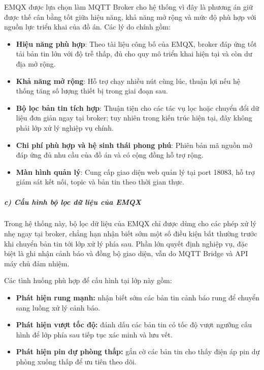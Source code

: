 \documentclass[a4paper]{extarticle}
\providecommand{\tightlist}{%
  \setlength{\itemsep}{0pt}\setlength{\parskip}{0pt}}
\begin{document}
EMQX được lựa chọn làm MQTT Broker cho hệ thống vì đây là phương án giữ
được thế cân bằng tốt giữa hiệu năng, khả năng mở rộng và mức độ phù hợp
với nguồn lực triển khai của đồ án. Các lý do chính gồm:

\begin{itemize}
\tightlist
\item
  \textbf{Hiệu năng phù hợp}: Theo tài liệu công bố của EMQX, broker đáp
  ứng tốt tải bản tin lớn với độ trễ thấp, đủ cho quy mô triển khai hiện
  tại và còn dư địa mở rộng.
\item
  \textbf{Khả năng mở rộng}: Hỗ trợ chạy nhiều nút cùng lúc, thuận lợi nếu
  hệ thống tăng số lượng thiết bị trong giai đoạn sau.
\item
  \textbf{Bộ lọc bản tin tích hợp}: Thuận tiện cho các tác vụ lọc hoặc
  chuyển đổi dữ liệu đơn giản ngay tại broker; tuy nhiên trong kiến trúc
  hiện tại, đây không phải lớp xử lý nghiệp vụ chính.
\item
  \textbf{Chi phí phù hợp và hệ sinh thái phong phú}: Phiên bản mã nguồn
  mở đáp ứng đủ nhu cầu của đồ án và có cộng đồng hỗ trợ rộng.
\item
  \textbf{Màn hình quản lý}: Cung cấp giao diện web quản lý tại port
  18083, hỗ trợ giám sát kết nối, topic và bản tin theo thời gian thực.
\end{itemize}

\subparagraph{c) Cấu hình bộ lọc dữ liệu của
EMQX}\label{c-cux1ea5u-huxecnh-emqx-rules-engine}

Trong hệ thống này, bộ lọc dữ liệu của EMQX chỉ được dùng cho các phép xử
lý nhẹ ngay tại broker, chẳng hạn nhận biết sớm một số điều kiện bất
thường trước khi chuyển bản tin tới lớp xử lý phía sau. Phần lớn quyết
định nghiệp vụ, đặc biệt là ghi nhận cảnh báo và đồng bộ giao diện, vẫn
do MQTT Bridge và API máy chủ đảm nhiệm.

Các tình huống phù hợp để cấu hình tại lớp này gồm:

\begin{itemize}
\tightlist
\item
  \textbf{Phát hiện rung mạnh:} nhận biết sớm các bản tin cảnh báo rung để
  chuyển sang luồng xử lý cảnh báo.
\item
  \textbf{Phát hiện vượt tốc độ:} đánh dấu các bản tin có tốc độ vượt
  ngưỡng cấu hình để lớp phía sau tiếp tục xác minh và lưu vết.
\item
  \textbf{Phát hiện pin dự phòng thấp:} gắn cờ các bản tin cho thấy điện
  áp pin dự phòng xuống thấp để ưu tiên theo dõi.
\end{itemize}
\end{document}
